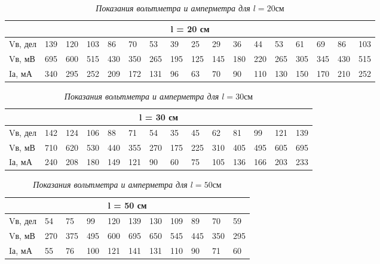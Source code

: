 \documentclass[a4paper,12pt]{article}
\begin{document}
\begin{table}[h]
\caption{\textit{Показания вольтметра и амперметра для $l = 20 \text{см}$}}
\label{l20}
	\begin{tabular}{|l|l|l|l|l|l|l|l|l|l|l|l|l|l|l|l|l|}
	\hline
	\multicolumn{17}{|c|}{l = 20 см}                                                                         	\\ \hline
	Vв, дел & 139 & 120 & 103 & 86  & 70  & 53  & 39  & 25  & 29  & 36  & 44  & 53  & 61  & 69  & 86  & 103 \\ \hline
	Vв, мВ  & 695 & 600 & 515 & 430 & 350 & 265 & 195 & 125 & 145 & 180 & 220 & 265 & 305 & 345 & 430 & 515 \\ \hline
	Iа, мА  & 340 & 295 & 252 & 209 & 172 & 131 & 96  & 63  & 70  & 90  & 110 & 130 & 150 & 170 & 210 & 252 \\ \hline
	\end{tabular}
\end{table}


\begin{table}[h]
\caption{\textit{Показания вольтметра и амперметра для $l = 30 \text{см}$}}
\label{l30}
	\begin{tabular}{|l|l|l|l|l|l|l|l|l|l|l|l|l|l|}
	\hline
	\multicolumn{14}{|c|}{l = 30 см}                                                       	\\ \hline
	Vв, дел & 142 & 124 & 106 & 88  & 71  & 54  & 35  & 45  & 62  & 81  & 99  & 121 & 139 \\ \hline
	Vв, мВ  & 710 & 620 & 530 & 440 & 355 & 270 & 175 & 225 & 310 & 405 & 495 & 605 & 695 \\ \hline
	Iа, мА  & 240 & 208 & 180 & 149 & 121 & 90  & 60  & 75  & 105 & 136 & 166 & 203 & 233 \\ \hline
	\end{tabular}
\end{table}


\begin{table}[h]
\caption{\textit{Показания вольтметра и амперметра для $l = 50 \text{см}$}}
\label{l50}
	\begin{tabular}{|l|l|l|l|l|l|l|l|l|l|l|}
	\hline
	\multicolumn{11}{|c|}{l = 50 см}                                     \\ \hline
	Vв, дел & 54  & 75  & 99  & 120 & 139 & 130 & 109 & 89  & 70  & 59  \\ \hline
	Vв, мВ  & 270 & 375 & 495 & 600 & 695 & 650 & 545 & 445 & 350 & 295 \\ \hline
	Iа, мА  & 55  & 76  & 100 & 121 & 141 & 131 & 110 & 90  & 71  & 60  \\ \hline
	\end{tabular}
\end{table}
\end{document}
